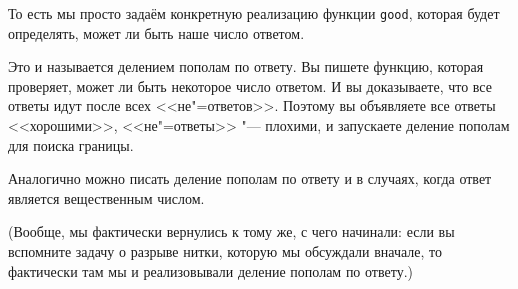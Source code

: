 \documentclass[a4paper,10pt]{problems}
\begin{document}
То есть мы просто задаём конкретную реализацию функции \verb`good`,
которая будет определять, может ли быть наше число ответом.

Это и называется делением пополам по ответу. 
Вы пишете функцию, которая проверяет, может ли быть некоторое число ответом.
И вы доказываете, что все ответы идут после всех <<не"=ответов>>.
Поэтому вы объявляете все ответы <<хорошими>>, <<не"=ответы>> "--- плохими,
и запускаете деление пополам для поиска границы.

Аналогично можно писать деление пополам по ответу и в случаях, когда ответ является
вещественным числом.

(Вообще, мы фактически вернулись к тому же, с чего начинали: если вы вспомните
задачу о разрыве нитки, которую мы обсуждали вначале, то фактически там мы
и реализовывали деление пополам по ответу.)

\end{document}
